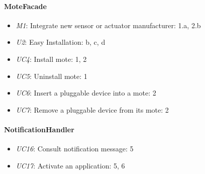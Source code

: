     \paragraph{MoteFacade}
        \begin{itemize}
            \item \emph{M1}: Integrate new sensor or actuator manufacturer: 1.a, 2.b
            \item \emph{U2}: Easy Installation: b, c, d
            \item \emph{UC4}: Install mote: 1, 2
            \item \emph{UC5}: Uninstall mote: 1
            \item \emph{UC6}: Insert a pluggable device into a mote: 2
            \item \emph{UC7}: Remove a pluggable device from its mote: 2
        \end{itemize}

    \paragraph{NotificationHandler}
        \begin{itemize}
            \item \emph{UC16}: Consult notification message: 5
            \item \emph{UC17}: Activate an application: 5, 6
        \end{itemize}

